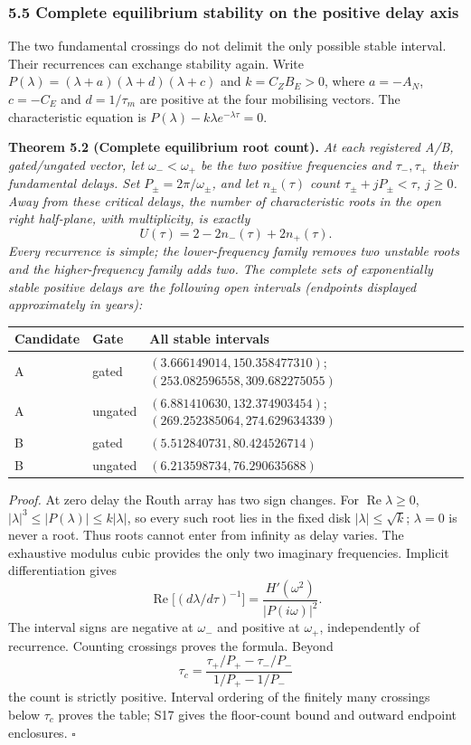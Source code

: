 \subsubsection{5.5 Complete equilibrium stability on the positive delay axis}
\label{complete-delay-spectrum}
The two fundamental crossings do not delimit the only possible stable
interval. Their recurrences can exchange stability again. Write
$P(\lambda)=(\lambda+a)(\lambda+d)(\lambda+c)$ and $k=C_ZB_E>0$,
where $a=-A_N$, $c=-C_E$ and $d=1/\tau_m$ are positive at the four
mobilising vectors. The characteristic equation is
$P(\lambda)-k\lambda e^{-\lambda\tau}=0$.

\textbf{Theorem 5.2 (Complete equilibrium root count).}
\emph{At each registered A/B, gated/ungated vector, let $\omega_-<\omega_+$
be the two positive frequencies and $\tau_-,\tau_+$ their fundamental
delays. Set $P_\pm=2\pi/\omega_\pm$, and let $n_\pm(\tau)$ count
$\tau_\pm+jP_\pm<\tau$, $j\ge0$. Away from these critical delays, the
number of characteristic roots in the open right half-plane, with
multiplicity, is exactly}
\[
 U(\tau)=2-2n_-(\tau)+2n_+(\tau).
\]
\emph{Every recurrence is simple; the lower-frequency family removes two
unstable roots and the higher-frequency family adds two. The complete
sets of exponentially stable positive delays are the following open
intervals (endpoints displayed approximately in years):}
\begin{center}\small
\begin{tabular}{lll}
\toprule Candidate & Gate & All stable intervals\\\midrule
A & gated & $(3.666149014,150.358477310)$; $(253.082596558,309.682275055)$\\
A & ungated & $(6.881410630,132.374903454)$; $(269.252385064,274.629634339)$\\
B & gated & $(5.512840731,80.424526714)$\\
B & ungated & $(6.213598734,76.290635688)$\\\bottomrule
\end{tabular}
\end{center}

\emph{Proof.} At zero delay the Routh array has two sign changes.
For $\operatorname{Re}\lambda\ge0$, $|\lambda|^3\le|P(\lambda)|
\le k|\lambda|$, so every such root lies in the fixed disk
$|\lambda|\le\sqrt{k}$; $\lambda=0$ is never a root. Thus roots cannot
enter from infinity as delay varies. The exhaustive modulus cubic
provides the only two imaginary frequencies. Implicit differentiation gives
\[
 \operatorname{Re}\bigl[(d\lambda/d\tau)^{-1}\bigr]
 =\frac{H'(\omega^2)}{|P(i\omega)|^2}.
\]
The interval signs are negative at $\omega_-$ and positive at
$\omega_+$, independently of recurrence. Counting crossings proves the
formula. Beyond
\[
 \tau_c=\frac{\tau_+/P_+-\tau_-/P_-}{1/P_+-1/P_-}
\]
the count is strictly positive. Interval ordering of the finitely many
crossings below $\tau_c$ proves the table; S17 gives the floor-count
bound and outward endpoint enclosures. \hfill$\square$

